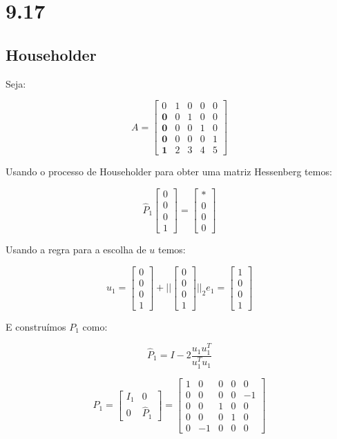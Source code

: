 \documentclass[11pt]{report}
\begin{document}
\chapter*{9.17}
\section*{Householder}
Seja:

\[
A = \begin{bmatrix}
0 & 1 & 0 & 0 & 0 \\
\mathbf{0} & 0 & 1 & 0 & 0 \\
\mathbf{0} & 0 & 0 & 1 & 0 \\
\mathbf{0} & 0 & 0 & 0 & 1 \\
\mathbf{1} & 2 & 3 & 4 & 5 
\end{bmatrix}
\]

Usando o processo de Householder para obter uma matriz Hessenberg temos:

\[
\hat{P}_1 \begin{bmatrix}
0 \\ 0 \\ 0 \\ 1
\end{bmatrix}
=
\begin{bmatrix}
* \\ 0 \\ 0 \\ 0
\end{bmatrix}
\]

Usando a regra para a escolha de $u$ temos:

\[
u_1 = \begin{bmatrix}
0 \\ 0 \\ 0 \\ 1
\end{bmatrix}
+ ||\begin{bmatrix}
0\\ 0 \\ 0 \\ 1
\end{bmatrix}||_2 e_1
=
\begin{bmatrix}
1\\ 0 \\ 0 \\ 1
\end{bmatrix}
\]

E construímos $P_1$ como:

\[
\hat{P}_1 = I - 2\frac{u_1u_1^T}{u_1^Tu_1}
\]

\[
P_1 = \begin{bmatrix}
I_1 & 0 \\
0   & \hat{P}_1
\end{bmatrix}
=
\begin{bmatrix}
1& 0 & 0 & 0& 0\\
0& 0 & 0 & 0& -1\\
0& 0 & 1 & 0& 0\\
0& 0 & 0 & 1& 0\\
0& -1 & 0 & 0& 0
\end{bmatrix}
\]
\end{document}
